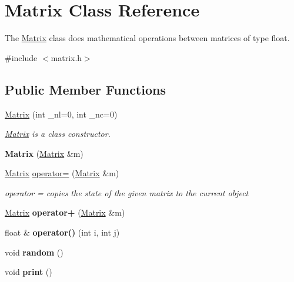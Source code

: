 \hypertarget{class_matrix}{}\section{Matrix Class Reference}
\label{class_matrix}


The \hyperlink{class_matrix}{Matrix} class does mathematical operations between matrices of type float.  




{\ttfamily \#include $<$matrix.\+h$>$}

\subsection*{Public Member Functions}
\begin{DoxyCompactItemize}
\item 
\hyperlink{class_matrix_ad46ac5e001ada4438e5f74c5eccdac2f}{Matrix} (int \+\_\+nl=0, int \+\_\+nc=0)
\begin{DoxyCompactList}\small\item\em \hyperlink{class_matrix}{Matrix} is a class constructor. \end{DoxyCompactList}\item 
\mbox{\label{class_matrix_af4c99503d4e4b31c5e73eceef9c7e1d0}} 
{\bfseries Matrix} (\hyperlink{class_matrix}{Matrix} \&m)
\item 
\hyperlink{class_matrix}{Matrix} \hyperlink{class_matrix_ac84e74316e8692a18dd704c745970efe}{operator=} (\hyperlink{class_matrix}{Matrix} \&m)
\begin{DoxyCompactList}\small\item\em operator = copies the state of the given matrix to the current object \end{DoxyCompactList}\item 
\mbox{\label{class_matrix_aa5b57ec3e95f139595d74b9a70e2e75a}} 
\hyperlink{class_matrix}{Matrix} {\bfseries operator+} (\hyperlink{class_matrix}{Matrix} \&m)
\item 
\mbox{\label{class_matrix_afbf1af2ff0e32dcf187c53c2d48cab80}} 
float \& {\bfseries operator()} (int i, int j)
\item 
\mbox{\label{class_matrix_aedd658d81933bec8660e8b22eeb442ca}} 
void {\bfseries random} ()
\item 
\mbox{\label{class_matrix_a99ba97122b8fdd54e95290caf80fc8e2}} 
void {\bfseries print} ()
\end{DoxyCompactItemize}


